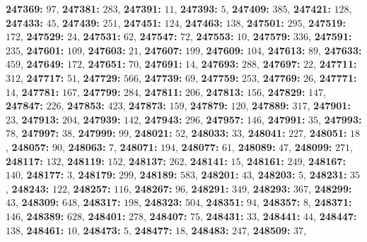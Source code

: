 \textsf{\bfseries 247369:} $97$, \textsf{\bfseries 247381:} $283$, \textsf{\bfseries 247391:} $11$, \textsf{\bfseries 247393:} $5$, \textsf{\bfseries 247409:} $385$, \textsf{\bfseries 247421:} $128$, \textsf{\bfseries 247433:} $45$, \textsf{\bfseries 247439:} $251$, \textsf{\bfseries 247451:} $124$, \textsf{\bfseries 247463:} $138$, \textsf{\bfseries 247501:} $295$, \textsf{\bfseries 247519:} $172$, \textsf{\bfseries 247529:} $24$, \textsf{\bfseries 247531:} $62$, \textsf{\bfseries 247547:} $72$, \textsf{\bfseries 247553:} $10$, \textsf{\bfseries 247579:} $336$, \textsf{\bfseries 247591:} $235$, \textsf{\bfseries 247601:} $109$, \textsf{\bfseries 247603:} $21$, \textsf{\bfseries 247607:} $199$, \textsf{\bfseries 247609:} $104$, \textsf{\bfseries 247613:} $89$, \textsf{\bfseries 247633:} $459$, \textsf{\bfseries 247649:} $172$, \textsf{\bfseries 247651:} $70$, \textsf{\bfseries 247691:} $14$, \textsf{\bfseries 247693:} $288$, \textsf{\bfseries 247697:} $22$, \textsf{\bfseries 247711:} $312$, \textsf{\bfseries 247717:} $51$, \textsf{\bfseries 247729:} $566$, \textsf{\bfseries 247739:} $69$, \textsf{\bfseries 247759:} $253$, \textsf{\bfseries 247769:} $26$, \textsf{\bfseries 247771:} $14$, \textsf{\bfseries 247781:} $167$, \textsf{\bfseries 247799:} $284$, \textsf{\bfseries 247811:} $206$, \textsf{\bfseries 247813:} $156$, \textsf{\bfseries 247829:} $147$, \textsf{\bfseries 247847:} $226$, \textsf{\bfseries 247853:} $423$, \textsf{\bfseries 247873:} $159$, \textsf{\bfseries 247879:} $120$, \textsf{\bfseries 247889:} $317$, \textsf{\bfseries 247901:} $23$, \textsf{\bfseries 247913:} $204$, \textsf{\bfseries 247939:} $142$, \textsf{\bfseries 247943:} $296$, \textsf{\bfseries 247957:} $146$, \textsf{\bfseries 247991:} $35$, \textsf{\bfseries 247993:} $78$, \textsf{\bfseries 247997:} $38$, \textsf{\bfseries 247999:} $99$, \textsf{\bfseries 248021:} $52$, \textsf{\bfseries 248033:} $33$, \textsf{\bfseries 248041:} $227$, \textsf{\bfseries 248051:} $18$, \textsf{\bfseries 248057:} $90$, \textsf{\bfseries 248063:} $7$, \textsf{\bfseries 248071:} $194$, \textsf{\bfseries 248077:} $61$, \textsf{\bfseries 248089:} $47$, \textsf{\bfseries 248099:} $271$, \textsf{\bfseries 248117:} $132$, \textsf{\bfseries 248119:} $152$, \textsf{\bfseries 248137:} $262$, \textsf{\bfseries 248141:} $15$, \textsf{\bfseries 248161:} $249$, \textsf{\bfseries 248167:} $140$, \textsf{\bfseries 248177:} $3$, \textsf{\bfseries 248179:} $299$, \textsf{\bfseries 248189:} $583$, \textsf{\bfseries 248201:} $43$, \textsf{\bfseries 248203:} $5$, \textsf{\bfseries 248231:} $35$, \textsf{\bfseries 248243:} $122$, \textsf{\bfseries 248257:} $116$, \textsf{\bfseries 248267:} $96$, \textsf{\bfseries 248291:} $349$, \textsf{\bfseries 248293:} $367$, \textsf{\bfseries 248299:} $43$, \textsf{\bfseries 248309:} $648$, \textsf{\bfseries 248317:} $198$, \textsf{\bfseries 248323:} $504$, \textsf{\bfseries 248351:} $94$, \textsf{\bfseries 248357:} $8$, \textsf{\bfseries 248371:} $146$, \textsf{\bfseries 248389:} $628$, \textsf{\bfseries 248401:} $278$, \textsf{\bfseries 248407:} $75$, \textsf{\bfseries 248431:} $33$, \textsf{\bfseries 248441:} $44$, \textsf{\bfseries 248447:} $138$, \textsf{\bfseries 248461:} $10$, \textsf{\bfseries 248473:} $5$, \textsf{\bfseries 248477:} $18$, \textsf{\bfseries 248483:} $247$, \textsf{\bfseries 248509:} $37$, 
